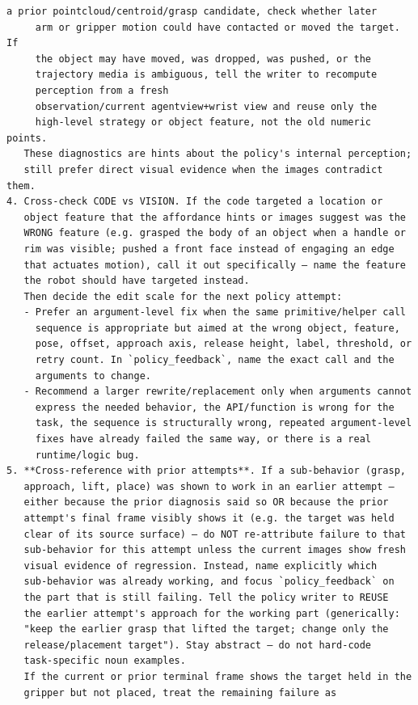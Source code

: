 \begin{lstlisting}[style=ratsappendixprompt]
     a prior pointcloud/centroid/grasp candidate, check whether later
     arm or gripper motion could have contacted or moved the target. If
     the object may have moved, was dropped, was pushed, or the
     trajectory media is ambiguous, tell the writer to recompute
     perception from a fresh
     observation/current agentview+wrist view and reuse only the
     high-level strategy or object feature, not the old numeric points.
   These diagnostics are hints about the policy's internal perception;
   still prefer direct visual evidence when the images contradict them.
4. Cross-check CODE vs VISION. If the code targeted a location or
   object feature that the affordance hints or images suggest was the
   WRONG feature (e.g. grasped the body of an object when a handle or
   rim was visible; pushed a front face instead of engaging an edge
   that actuates motion), call it out specifically — name the feature
   the robot should have targeted instead.
   Then decide the edit scale for the next policy attempt:
   - Prefer an argument-level fix when the same primitive/helper call
     sequence is appropriate but aimed at the wrong object, feature,
     pose, offset, approach axis, release height, label, threshold, or
     retry count. In `policy_feedback`, name the exact call and the
     arguments to change.
   - Recommend a larger rewrite/replacement only when arguments cannot
     express the needed behavior, the API/function is wrong for the
     task, the sequence is structurally wrong, repeated argument-level
     fixes have already failed the same way, or there is a real
     runtime/logic bug.
5. **Cross-reference with prior attempts**. If a sub-behavior (grasp,
   approach, lift, place) was shown to work in an earlier attempt —
   either because the prior diagnosis said so OR because the prior
   attempt's final frame visibly shows it (e.g. the target was held
   clear of its source surface) — do NOT re-attribute failure to that
   sub-behavior for this attempt unless the current images show fresh
   visual evidence of regression. Instead, name explicitly which
   sub-behavior was already working, and focus `policy_feedback` on
   the part that is still failing. Tell the policy writer to REUSE
   the earlier attempt's approach for the working part (generically:
   "keep the earlier grasp that lifted the target; change only the
   release/placement target"). Stay abstract — do not hard-code
   task-specific noun examples.
   If the current or prior terminal frame shows the target held in the
   gripper but not placed, treat the remaining failure as

\end{lstlisting}
